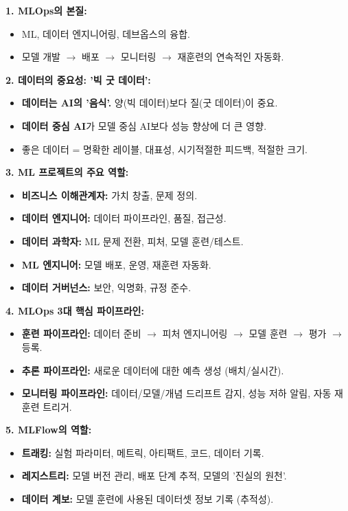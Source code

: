 \documentclass[11pt,a4paper]{article}
\begin{document}
\begin{tcolorbox}[colback=myblue!10!white, colframe=myblue!75!black, title=\textbf{CSCI103 Lecture 9 핵심 요약}]

\textbf{1. MLOps의 본질:}
\begin{itemize}
    \item ML, 데이터 엔지니어링, 데브옵스의 융합.
    \item 모델 개발 $\rightarrow$ 배포 $\rightarrow$ 모니터링 $\rightarrow$ 재훈련의 연속적인 자동화.
\end{itemize}

\textbf{2. 데이터의 중요성: '빅 굿 데이터':}
\begin{itemize}
    \item \textbf{데이터는 AI의 '음식'.} 양(빅 데이터)보다 질(굿 데이터)이 중요.
    \item \textbf{데이터 중심 AI}가 모델 중심 AI보다 성능 향상에 더 큰 영향.
    \item 좋은 데이터 = 명확한 레이블, 대표성, 시기적절한 피드백, 적절한 크기.
\end{itemize}

\textbf{3. ML 프로젝트의 주요 역할:}
\begin{itemize}
    \item \textbf{비즈니스 이해관계자:} 가치 창출, 문제 정의.
    \item \textbf{데이터 엔지니어:} 데이터 파이프라인, 품질, 접근성.
    \item \textbf{데이터 과학자:} ML 문제 전환, 피처, 모델 훈련/테스트.
    \item \textbf{ML 엔지니어:} 모델 배포, 운영, 재훈련 자동화.
    \item \textbf{데이터 거버넌스:} 보안, 익명화, 규정 준수.
\end{itemize}

\textbf{4. MLOps 3대 핵심 파이프라인:}
\begin{itemize}
    \item \textbf{훈련 파이프라인:} 데이터 준비 $\rightarrow$ 피처 엔지니어링 $\rightarrow$ 모델 훈련 $\rightarrow$ 평가 $\rightarrow$ 등록.
    \item \textbf{추론 파이프라인:} 새로운 데이터에 대한 예측 생성 (배치/실시간).
    \item \textbf{모니터링 파이프라인:} 데이터/모델/개념 드리프트 감지, 성능 저하 알림, 자동 재훈련 트리거.
\end{itemize}

\textbf{5. MLFlow의 역할:}
\begin{itemize}
    \item \textbf{트래킹:} 실험 파라미터, 메트릭, 아티팩트, 코드, 데이터 기록.
    \item \textbf{레지스트리:} 모델 버전 관리, 배포 단계 추적, 모델의 '진실의 원천'.
    \item \textbf{데이터 계보:} 모델 훈련에 사용된 데이터셋 정보 기록 (추적성).
\end{itemize}


\end{tcolorbox}
\end{document}
